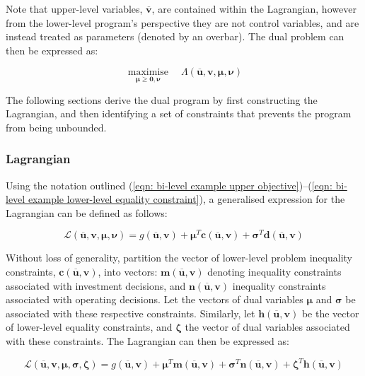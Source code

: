 \documentclass{article}
\DeclareMathOperator*{\maximise}{maximise}
\begin{document}
Note that upper-level variables, $\bm{\overline{v}}$, are contained within the Lagrangian, however from the lower-level program's perspective they are not control variables, and are instead treated as parameters (denoted by an overbar). The dual problem can then be expressed as:

\begin{equation}
\maximise\limits_{\bm{\mu}\geq \bm{0}, \bm{\nu}} \quad \Lambda(\bm{\overline{u}}, \bm{v}, \bm{\mu}, \bm{\nu})
\end{equation}

The following sections derive the dual program by first constructing the Lagrangian, and then identifying a set of constraints that prevents the program from being unbounded.

\subsubsection{Lagrangian}
Using the notation outlined (\ref{eqn: bi-level example upper objective})--(\ref{eqn: bi-level example lower-level equality constraint}), a generalised expression for the Lagrangian can be defined as follows:

\begin{equation}
	\mathcal{L}(\bm{\overline{u}}, \bm{v}, \bm{\mu}, \bm{\nu}) = g(\bm{\overline{u}}, \bm{v}) + \bm{\mu}^{T}\bm{c}(\bm{\overline{u}}, \bm{v}) + \bm{\sigma}^{T}\bm{d}(\bm{\overline{u}}, \bm{v})
\end{equation}

Without loss of generality, partition the vector of lower-level problem inequality constraints, $\bm{c}(\bm{\overline{u}}, \bm{v})$, into vectors: $\bm{m}(\bm{\overline{u}}, \bm{v})$ denoting inequality constraints associated with investment decisions, and $\bm{n}(\bm{\overline{u}}, \bm{v})$ inequality constraints associated with operating decisions. Let the vectors of dual variables $\bm{\mu}$ and $\bm{\sigma}$ be associated with these respective constraints. Similarly, let $\bm{h}(\bm{\overline{u}}, \bm{v})$ be the vector of lower-level equality constraints, and $\bm{\zeta}$ the vector of dual variables associated with these constraints. The Lagrangian can then be expressed as:

\begin{equation}
	\mathcal{L}(\bm{\overline{u}}, \bm{v}, \bm{\mu}, \bm{\sigma}, \bm{\zeta}) = g(\bm{\overline{u}}, \bm{v}) + \bm{\mu}^{T}\bm{m}(\bm{\overline{u}}, \bm{v}) + \bm{\sigma}^{T}\bm{n}(\bm{\overline{u}}, \bm{v}) + \bm{\zeta}^{T}\bm{h}(\bm{\overline{u}}, \bm{v})
\end{equation}
\end{document}
